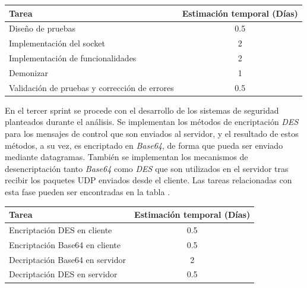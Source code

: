 \documentclass[12pt]{article}
\begin{document}
            \begin{tabular}{|l|c|}
                \hline
                \textbf{Tarea}                                                              &   \textbf{Estimación temporal} (Días) \\           
                \hline
                Diseño de pruebas                                                           &   0.5                                 \\
                Implementación del socket                                                   &   2                                   \\
                Implementación de funcionalidades                                           &   2                                   \\
                Demonizar                                                                   &   1                                   \\
                Validación de pruebas y corrección de errores                               &   0.5                                 \\
                \hline
            \end{tabular}

            En el tercer sprint se procede con el desarrollo de los sistemas de seguridad planteados durante el análisis. Se implementan los métodos de encriptación \textit{DES} para los mensajes de control que son enviados al servidor, y el resultado de estos métodos, a su vez, es encriptado en \textit{Base64}, de forma que pueda ser enviado mediante datagramas. También se implementan los mecanismos de desencriptación tanto \textit{Base64} como \textit{DES} que son utilizados en el servidor tras recibir los paquetes UDP enviados desde el cliente. Las tareas relacionadas con esta fase pueden ser encontradas en la tabla .

            \begin{tabular}{|l|c|}
                \hline
                \textbf{Tarea}                                                              &   \textbf{Estimación temporal} (Días) \\           
                \hline
                Encriptación DES en cliente                                                 &   0.5                                 \\
                Encriptación Base64 en cliente                                              &   0.5                                 \\
                Decriptación Base64 en servidor                                             &   2                                   \\
                Decriptación DES en servidor                                                &   0.5                                 \\
                \hline
            \end{tabular}
\end{document}
